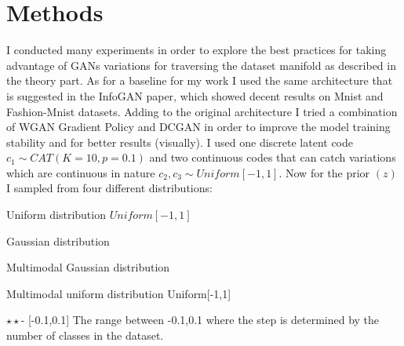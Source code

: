 \documentclass[letterpaper,12pt]{article}
\begin{document}
\section{Methods}
I conducted many experiments in order to explore the best practices for taking advantage of GANs variations for traversing the dataset manifold as described in the theory part. As for a baseline for my work I used the same architecture that is suggested in the InfoGAN paper, which showed decent results on Mnist and Fashion-Mnist datasets. Adding to the original architecture I tried a combination of WGAN Gradient Policy and DCGAN in order to improve the model training stability and for better results (visually). I used one discrete latent code \(c_1\sim CAT(K=10, p=0.1)\) and two continuous codes that can catch variations which are continuous in nature \(c_2,c_3\sim Uniform[-1,1]\). Now for the prior \((z)\) I sampled from four different distributions: \begin{enumerate*}[label={\roman*)},font={\color{red!50!black}\bfseries}]	
\linebreak\newline\item Uniform distribution \(Uniform[-1,1]\) \newline
\item Gaussian distribution %
\newline
\item Multimodal Gaussian distribution%
\newline
\item Multimodal uniform distribution Uniform[-1,1]\newline
\end{enumerate*}
\newline
\newline
$\star\star$- [-0.1,0.1] The range between -0.1,0.1 where the step is determined by the number of classes in the dataset.
\end{document}
